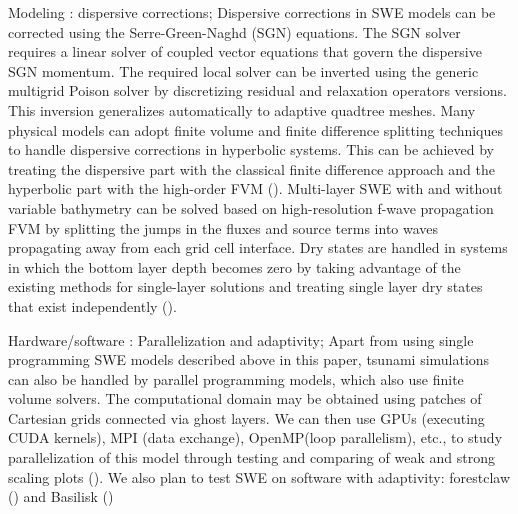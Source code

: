 \documentclass[10pt,a4paper]{article}
\begin{document}
Modeling : dispersive corrections; Dispersive corrections in SWE models can be corrected using the Serre-Green-Naghd (SGN) equations. The SGN solver requires a linear solver of coupled vector equations that govern the dispersive SGN momentum.  The required local solver can be inverted using the generic multigrid Poison solver by discretizing residual and relaxation operators versions. This inversion generalizes automatically to adaptive quadtree meshes. Many physical models can adopt finite volume and finite difference splitting techniques to handle dispersive corrections in hyperbolic systems.  This can be achieved by treating the dispersive part with the classical finite difference approach and the hyperbolic part with the high-order FVM (\cite{la-bo:2009,po:2020,po:2015}). 
Multi-layer SWE with and without variable bathymetry can be solved based on high-resolution f-wave propagation FVM by splitting the jumps in the fluxes and source terms into waves propagating away from each grid cell interface. Dry states are handled in systems in which the bottom layer depth becomes zero by taking advantage of the existing methods for single-layer solutions and treating single layer dry states that exist independently (\cite{mandli2013numerical}).


Hardware/software : Parallelization and adaptivity; Apart from using single programming SWE models described above in this paper, tsunami simulations can also be handled by parallel programming models, which also use finite volume solvers.  The computational domain may be obtained using patches of Cartesian grids connected via ghost layers.  We can then use GPUs (executing CUDA kernels), MPI (data exchange), OpenMP(loop parallelism), etc., to study parallelization of this model through testing and comparing of weak and strong scaling plots (\cite{qi-le-mo:2018}).  We also plan to test SWE on software with adaptivity: forestclaw (\cite{be-ge-le-ma:2011}) and  Basilisk (\cite{po:2015})


	
	
	
	
	
	
	
\end{document}
